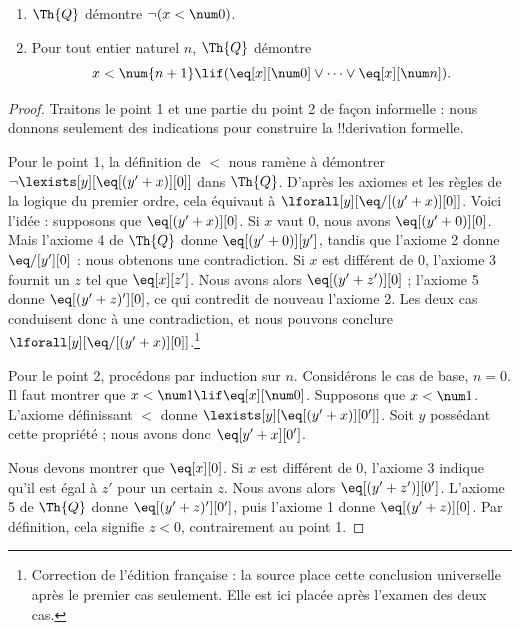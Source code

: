 \documentclass[../../../include/open-logic-section]{subfiles}
\begin{document}
\begin{lem}
\begin{enumerate}
\item $\Th{Q}$ démontre $\lnot(x<\num 0)$.
\item Pour tout entier naturel $n$, $\Th{Q}$ démontre
\[
x < \num {n+1} \lif (\eq[x][\num 0] \lor \dots \lor \eq[x][\num n]).
\]
\end{enumerate}
\end{lem}

\begin{proof}
Traitons le point 1 et une partie du point 2 de façon
informelle : nous donnons seulement des indications pour
construire la !!{derivation} formelle.

Pour le point 1, la définition de $<$ nous ramène à
démontrer $\lnot\lexists[y][\eq[(y'+x)][0]]$ dans
$\Th{Q}$. D'après les axiomes et les règles de la logique
du premier ordre, cela équivaut à
$\lforall[y][\eq/[(y'+x)][0]]$.
Voici l'idée : supposons que $\eq[(y'+x)][0]$.
Si $x$ vaut 0, nous avons $\eq[(y'+0)][0]$.
Mais l'axiome 4 de $\Th{Q}$ donne $\eq[(y'+0)][y']$,
tandis que l'axiome 2 donne $\eq/[y'][0]$ :
nous obtenons une contradiction.
Si $x$ est différent de $0$, l'axiome 3 fournit un $z$
tel que $\eq[x][z']$. Nous avons alors
$\eq[(y'+z')][0]$ ; l'axiome 5 donne
$\eq[(y'+z)'][0]$, ce qui contredit de nouveau
l'axiome 2. Les deux cas conduisent donc à une contradiction,
et nous pouvons conclure
$\lforall[y][\eq/[(y'+x)][0]]$.\footnote{Correction de
l'édition française : la source place cette conclusion
universelle après le premier cas seulement. Elle est ici
placée après l'examen des deux cas.}

Pour le point 2, procédons par induction sur $n$.
Considérons le cas de base, $n=0$.
Il faut montrer que $x<\num 1\lif\eq[x][\num 0]$.
Supposons que $x<\num 1$. L'axiome définissant $<$ donne
$\lexists[y][\eq[(y'+x)][0']]$.
Soit $y$ possédant cette propriété ; nous avons donc
$\eq[y'+x][0']$.

Nous devons montrer que $\eq[x][0]$.
Si $x$ est différent de 0, l'axiome 3 indique qu'il est
égal à $z'$ pour un certain $z$. Nous avons alors
$\eq[(y'+z')][0']$.
L'axiome 5 de $\Th{Q}$ donne
$\eq[(y'+z)'][0']$, puis l'axiome 1 donne
$\eq[(y'+z)][0]$. Par définition, cela signifie
$z<0$, contrairement au point 1.
\end{proof}
\end{document}
